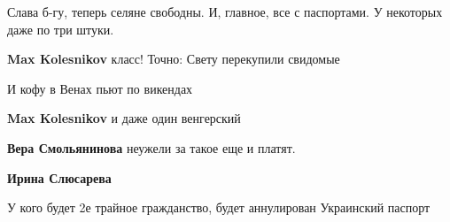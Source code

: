 \begin{itemize}
Слава б-гу, теперь селяне свободны. И, главное, все с паспортами. У некоторых даже по три штуки.

\begin{itemize}
 
\textbf{Max Kolesnikov} класс! Точно: Свету перекупили свидомые

 
И кофу в Венах пьют по викендах

 
\textbf{Max Kolesnikov} и даже один венгерский

 
\textbf{Вера Смольянинова} неужели за такое еще и платят.

 
\textbf{Ирина Слюсарева} 🤣🤣🤣

 
У кого будет 2е трайное гражданство, будет аннулирован Украинский паспорт

 

\end{itemize}
\end{itemize}

